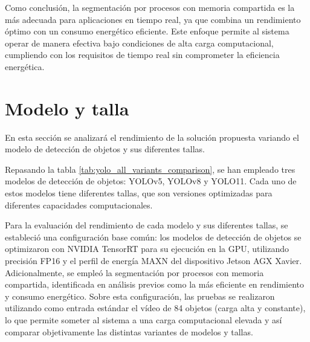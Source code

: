 \documentclass[11pt,spanish,listoffigures,listoftables]{tfgetsinf}
\begin{document}
Como conclusión, la segmentación por procesos con memoria compartida es la más adecuada para aplicaciones en tiempo real, ya que combina un rendimiento óptimo con un consumo energético eficiente. Este enfoque permite al sistema operar de manera efectiva bajo condiciones de alta carga computacional, cumpliendo con los requisitos de tiempo real sin comprometer la eficiencia energética.

\section{Modelo y talla} \label{sub:modelo_talla}
En esta sección se analizará el rendimiento de la solución propuesta variando el modelo de detección de objetos y sus diferentes tallas.

Repasando la tabla \ref{tab:yolo_all_variants_comparison}, se han empleado tres modelos de detección de objetos: YOLOv5, YOLOv8 y YOLO11. Cada uno de estos modelos tiene diferentes tallas, que son versiones optimizadas para diferentes capacidades computacionales. 

Para la evaluación del rendimiento de cada modelo y sus diferentes tallas, se estableció una configuración base común: los modelos de detección de objetos se optimizaron con NVIDIA TensorRT para su ejecución en la GPU, utilizando precisión FP16 y el perfil de energía MAXN del dispositivo Jetson AGX Xavier. Adicionalmente, se empleó la segmentación por procesos con memoria compartida, identificada en análisis previos como la más eficiente en rendimiento y consumo energético. Sobre esta configuración, las pruebas se realizaron utilizando como entrada estándar el vídeo de 84 objetos (carga alta y constante), lo que permite someter al sistema a una carga computacional elevada y así comparar objetivamente las distintas variantes de modelos y tallas.
\end{document}
